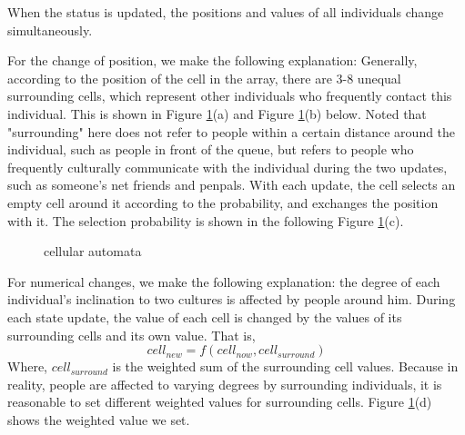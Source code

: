 \documentclass{mcmthesis}
\begin{document}
When the status is updated, the positions and values of all individuals change simultaneously.

For the change of position, we make the following explanation: Generally, according to the position of the cell in the array, there are 3-8 unequal surrounding cells, which represent other individuals who frequently contact this individual. This is shown in Figure \ref{yuanbao}(a) and Figure \ref{yuanbao}(b) below. Noted that "surrounding" here does not refer to people within a certain distance around the individual, such as people in front of the queue, but refers to people who frequently culturally communicate with the individual during the two updates, such as someone's net friends and penpals. With each update, the cell selects an empty cell around it according to the probability, and exchanges the position with it. The selection probability is shown in the following Figure \ref{yuanbao}(c).
\begin{figure}[H]%
	\centering
\caption{cellular automata}\label{yuanbao}
\end{figure}


For numerical changes, we make the following explanation: the degree of each individual's inclination to two cultures is affected by people around him. During each state update, the value of each cell is changed by the values of its surrounding cells and its own value. That is,
\begin{equation}
	cell_{new}=f(cell_{now} , cell_{surround})
\end{equation}
Where, $ cell_{surround} $ is the weighted sum of the surrounding cell values. Because in reality, people are affected to varying degrees by surrounding individuals, it is reasonable to set different weighted values for surrounding cells. Figure \ref{yuanbao}(d) shows the weighted value we set.
\end{document}
